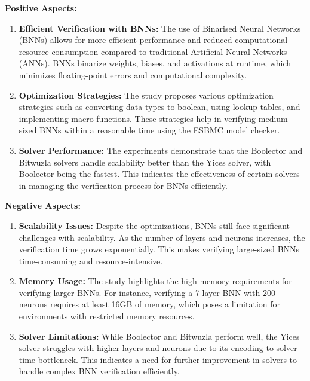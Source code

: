 \documentclass[conference]{IEEEtran}
\begin{document}
\textbf{Positive Aspects:}
\begin{enumerate}
    \item \textbf{Efficient Verification with BNNs:} The use of Binarised Neural Networks (BNNs) allows for more efficient performance and reduced computational resource consumption compared to traditional Artificial Neural Networks (ANNs). BNNs binarize weights, biases, and activations at runtime, which minimizes floating-point errors and computational complexity.
    \item \textbf{Optimization Strategies:} The study proposes various optimization strategies such as converting data types to boolean, using lookup tables, and implementing macro functions. These strategies help in verifying medium-sized BNNs within a reasonable time using the ESBMC model checker.
    \item \textbf{Solver Performance:} The experiments demonstrate that the Boolector and Bitwuzla solvers handle scalability better than the Yices solver, with Boolector being the fastest. This indicates the effectiveness of certain solvers in managing the verification process for BNNs efficiently.
\end{enumerate}

\textbf{Negative Aspects:}
\begin{enumerate}
    \item \textbf{Scalability Issues:} Despite the optimizations, BNNs still face significant challenges with scalability. As the number of layers and neurons increases, the verification time grows exponentially. This makes verifying large-sized BNNs time-consuming and resource-intensive.
    \item \textbf{Memory Usage:} The study highlights the high memory requirements for verifying larger BNNs. For instance, verifying a 7-layer BNN with 200 neurons requires at least 16GB of memory, which poses a limitation for environments with restricted memory resources.
    \item \textbf{Solver Limitations:} While Boolector and Bitwuzla perform well, the Yices solver struggles with higher layers and neurons due to its encoding to solver time bottleneck. This indicates a need for further improvement in solvers to handle complex BNN verification efficiently.
\end{enumerate}
\end{document}
